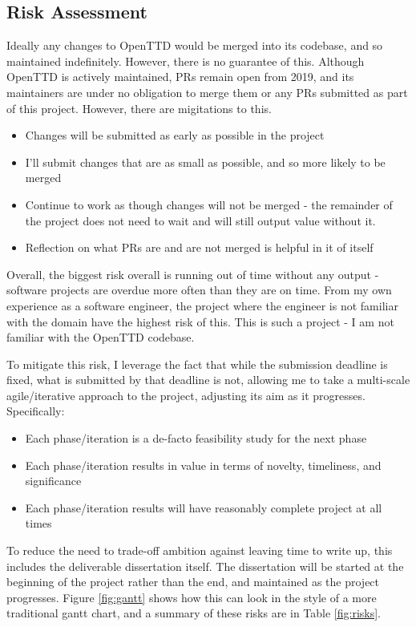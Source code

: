 \documentclass[a4paper,11pt]{article}
\begin{document}
\subsection{Risk Assessment}
\label{riskassessment}

Ideally any changes to OpenTTD would be merged into its codebase, and so maintained indefinitely. However, there is no guarantee of this. Although OpenTTD is actively maintained, PRs remain open from 2019, and its maintainers are under no obligation to merge them or any PRs submitted as part of this project. However, there are migitations to this.

\begin{itemize}
    \item Changes will be submitted as early as possible in the project
    \item I'll submit changes that are as small as possible, and so more likely to be merged
    \item Continue to work as though changes will not be merged - the remainder of the project does not need to wait and will still output value without it.
    \item Reflection on what PRs are and are not merged is helpful in it of itself
\end{itemize}

Overall, the biggest risk overall is running out of time without any output - software projects are overdue more often than they are on time. From my own experience as a software engineer, the project where the engineer is not familiar with the domain have the highest risk of this. This is such a project - I am not familiar with the OpenTTD codebase.

To mitigate this risk, I leverage the fact that while the submission deadline is fixed, what is submitted by that deadline is not, allowing me to take a multi-scale agile/iterative approach to the project, adjusting its aim as it progresses. Specifically:

\begin{itemize}
    \item Each phase/iteration is a de-facto feasibility study for the next phase
    \item Each phase/iteration results in value in terms of novelty, timeliness, and significance
    \item Each phase/iteration results will have reasonably complete project at all times
\end{itemize}

To reduce the need to trade-off ambition against leaving time to write up, this includes the deliverable dissertation itself. The dissertation will be started at the beginning of the project rather than the end, and maintained as the project progresses. Figure \ref{fig:gantt} shows how this can look in the style of a more traditional gantt chart, and a summary of these risks are in Table \ref{fig:risks}.
\end{document}
